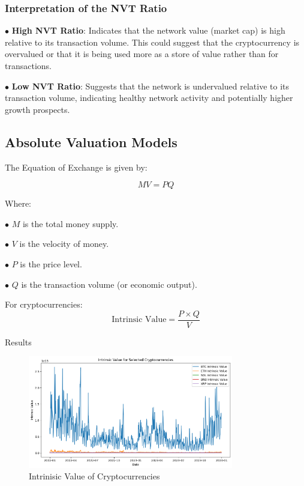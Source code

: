 \documentclass{ledger}
\begin{document}
\subsubsection{Interpretation of the NVT Ratio}

$ \bullet $  \textbf{High NVT Ratio}: Indicates that the network value (market cap) is high relative to its transaction volume. This could suggest that the cryptocurrency is overvalued or that it is being used more as a store of value rather than for transactions.

$ \bullet $  \textbf{Low NVT Ratio}: Suggests that the network is undervalued relative to its transaction volume, indicating healthy network activity and potentially higher growth prospects.

\subsection{Absolute Valuation Models}

The Equation of Exchange is given by:

\[
MV = PQ
\]

Where:

$ \bullet $  $M$ is the total money supply.

$ \bullet $  $V$ is the velocity of money.

$ \bullet $ $P$ is the price level.

$ \bullet $ $Q$ is the transaction volume (or economic output).


For cryptocurrencies:
\[
\text{Intrinsic Value} = \frac{P \times Q}{V}
\]

Results

\begin{figure}
    \centering
    \includegraphics[width=0.8\textwidth]{./code/valuation-techniques/intrinsic_value.png}
    \caption{Intrinisic Value of Cryptocurrencies}
    \label{fig:beta}
\end{figure}
\end{document}
